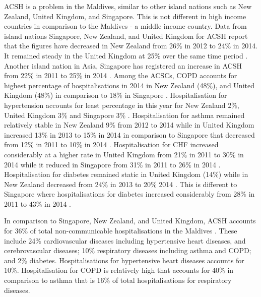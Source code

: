 ACSH is a problem in the Maldives, similar to other island nations such as New Zealand, United Kingdom, and Singapore. This is not different in high income countries in comparison to the Maldives - a middle income country. Data from island nations Singapore, New Zealand, and United Kingdom for ACSH report that the figures have decreased in New Zealand from 26\% in 2012 to 24\% in 2014\cite{OECD:Data:countries}. It remained steady in the United Kingdom at 25\% over the same time period \cite{OECD:Data:countries}. Another island nation in Asia, Singapore has registered an increase in ACSH from 22\% in 2011 to 25\% in 2014 \cite{OECD:Data:countries}. Among the ACSCs, COPD accounts for highest percentage of hospitalisations in 2014 in New Zealand (48\%), and United Kingdom (48\%) in comparison to 18\% in Singapore \cite{OECD:Data:countries}. Hospitalisation for hypertension accounts for least percentage in this year for New Zealand 2\%, United Kingdom 3\% and Singapore 3\% \cite{OECD:Data:countries}. Hospitalisation for asthma remained relatively stable in New Zealand 9\% from 2012 to 2014 while in United Kingdom increased 13\% in 2013 to 15\% in 2014 in comparison to Singapore that decreased from 12\% in 2011 to 10\% in 2014 \cite{OECD:Data:countries}. Hospitalisation for CHF increased considerably at a higher rate in United Kingdom from 21\% in 2011 to 30\% in 2014 while it reduced in Singapore from 31\% in 2011 to 26\% in 2014 \cite{OECD:Data:countries}. Hospitalisation for diabetes remained static in United Kingdom (14\%) while in New Zealand decreased from 24\% in 2013 to 20\% 2014 \cite{OECD:Data:countries}. This is different to Singapore where hospitalisations for diabetes increased considerably from 28\% in 2011 to 43\% in 2014 \cite{OECD:Data:countries}. 


In comparison to Singapore, New Zealand, and United Kingdom, ACSH accounts for 36\% of total non-communicable hospitalisations in the Maldives \cite{Maldives:nationalhealthstatistics:2019}. These include 24\% cardiovascular diseases including hypertensive heart diseases, and cerebrovascular diseases; 10\% respiratory diseases including asthma and COPD; and 2\% diabetes. Hospitalisations for hypertensive heart diseases accounts for 10\%. Hospitalisation for COPD is relatively high that accounts for 40\% in comparison to asthma that is 16\% of total hospitalisations for respiratory diseases. 

